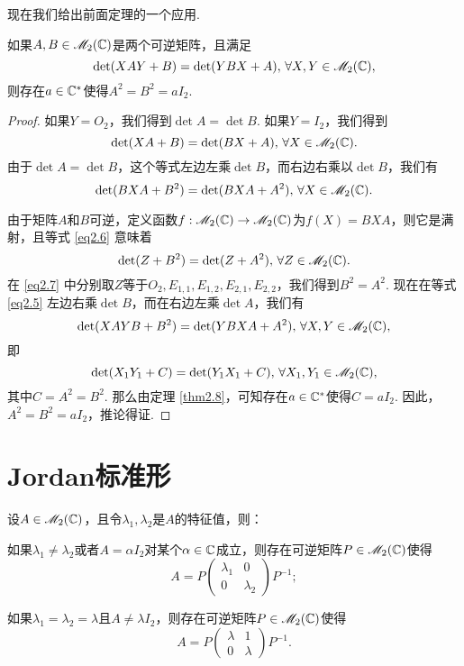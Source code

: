 现在我们给出前面定理的一个应用.

\begin{corollary}
  如果$A,B\in\mathscr M_2(\mathbb C)$是两个可逆矩阵，且满足
  \begin{equation}\label{eq2.5}
    \det (XAY + B) = \det(YBX + A),\,\forall X,Y\in\mathscr M_2(\mathbb C),
  \end{equation}
  则存在$a\in\mathbb C^\ast$使得$A^2=B^2=aI_2$.
\end{corollary}

\begin{proof}
  如果$Y=O_2$，我们得到$\det A=\det B$. 如果$Y=I_2$，我们得到
  \[
    \det (XA + B) = \det (BX + A),\,\forall X\in\mathscr M_2(\mathbb C).
  \]
  由于$\det A=\det B$，这个等式左边左乘$\det B$，而右边右乘以$\det B$，我们有
  \begin{equation}\label{eq2.6}
    \det (BXA + B^2) = \det (BXA + A^2),\,\forall X\in\mathscr M_2(\mathbb C).
  \end{equation}

  由于矩阵$A$和$B$可逆，定义函数$f:\mathscr M_2(\mathbb C)\to\mathscr M_2(\mathbb C)$为$f(X)=BXA$，则它是满射，且等式 \eqref{eq2.6} 意味着
  \begin{equation}\label{eq2.7}
    \det (Z + B^2) = \det (Z + A^2),\,\forall Z\in\mathscr M_2(\mathbb C).
  \end{equation}
  在 \eqref{eq2.7} 中分别取$Z$等于$O_2,E_{1,1},E_{1,2},E_{2,1},E_{2,2}$，我们得到$B^2=A^2$. 现在在等式 \eqref{eq2.5} 左边右乘$\det B$，而在右边左乘$\det A$，我们有
  \[
    \det (XAYB + B^2) = \det (YBXA + A^2),\,\forall X,Y\in\mathscr M_2(\mathbb C),
  \]
  即
  \[
    \det (X_1Y_1 + C) = \det (Y_1X_1 + C),\,\forall X_1,Y_1\in\mathscr M_2(\mathbb C),
  \]
  其中$C=A^2=B^2$. 那么由定理 \ref{thm2.8}，可知存在$a\in\mathbb C^\ast$使得$C=aI_2$. 因此，$A^2=B^2=aI_2$，推论得证.
\end{proof}

\section{Jordan标准形}
\begin{mybox}
  \begin{theorem}[复Jordan标准形.]

    设$A\in\mathscr M_2(\mathbb C)$，且令$\lambda_1,\lambda_2$是$A$的特征值，则：
    \begin{enum}
      \item 如果$\lambda_1\ne\lambda_2$或者$A=\alpha I_2$对某个$\alpha\in\mathbb C$成立，则存在可逆矩阵$P\in\mathscr M_2(\mathbb C)$使得
          \[
            A = P\begin{pmatrix}
              \lambda_1 & 0 \\
              0 & \lambda_2
            \end{pmatrix} P^{-1};
          \]
      \item 如果$\lambda_1=\lambda_2=\lambda$且$A\ne\lambda I_2$，则存在可逆矩阵$P\in\mathscr M_2(\mathbb C)$使得
          \[
            A = P\begin{pmatrix}
              \lambda & 1 \\
              0 & \lambda
            \end{pmatrix} P^{-1}.
          \]
    \end{enum}
  \end{theorem}
\end{mybox}


